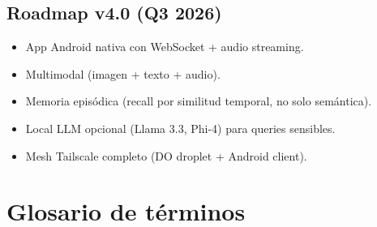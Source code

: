 \documentclass[11pt,a4paper]{article}
\begin{document}
\subsection{Roadmap v4.0 (Q3 2026)}

\begin{itemize}[leftmargin=*,itemsep=1pt]
\item App Android nativa con WebSocket + audio streaming.
\item Multimodal (imagen + texto + audio).
\item Memoria episódica (recall por similitud temporal, no solo semántica).
\item Local LLM opcional (Llama 3.3, Phi-4) para queries sensibles.
\item Mesh Tailscale completo (DO droplet + Android client).
\end{itemize}

\newpage

\section{Glosario de términos}
\end{document}
